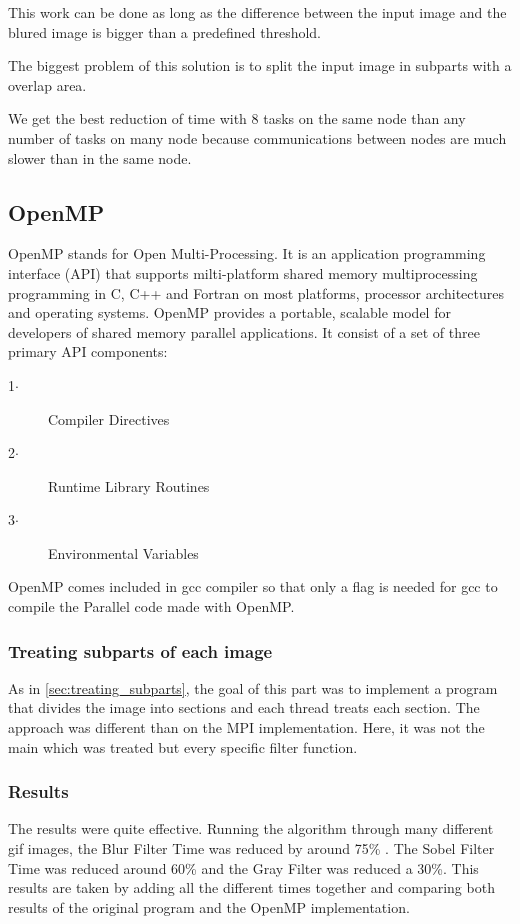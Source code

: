 \documentclass[conference,compsoc]{IEEEtran}
\begin{document}
This work can be done as long as the difference between the input image and the blured image is bigger than a predefined threshold.

The biggest problem of this solution is to split the input image in subparts with a overlap area.

We get the best reduction of time with 8 tasks on the same node than any number of tasks on many node because communications between nodes are much slower than in the same node.

\subsection{OpenMP}
OpenMP stands for Open Multi-Processing. It is an application programming interface (API) that supports milti-platform shared memory multiprocessing programming in C, C++ and Fortran on most platforms, processor architectures and operating systems.
OpenMP provides a portable, scalable model for developers of shared memory parallel applications.
It consist of a set of three primary API components:
\begin{description}
	\item[1$\cdot$] Compiler Directives
	\item[2$\cdot$] Runtime Library Routines
	\item[3$\cdot$] Environmental Variables
\end{description}

OpenMP comes included in gcc compiler so that only a flag is needed for gcc to compile the Parallel code made with OpenMP.

\subsubsection{Treating subparts of each image}
As in \ref{sec:treating_subparts}, the goal of this part was to implement a program that divides the image into sections and each thread treats each section. The approach was different than on the MPI implementation. Here, it was not the main which was treated but every specific filter function.

\subsubsection{Results}
The results were quite effective. Running the algorithm through many different gif images, the Blur Filter Time was reduced by around 75\% . The Sobel Filter Time was reduced around 60\% and the Gray Filter was reduced a 30\%. This results are taken by adding all the different times together and comparing both results of the original program and the OpenMP implementation.
\end{document}
